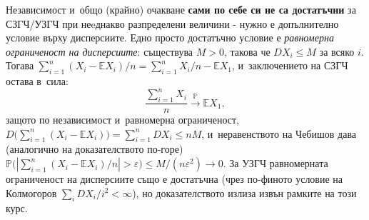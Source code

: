 \begin{rembox}[Обобщение при \texorpdfstring{$\mathbb EX_1=\mathbb EX_i$}{EX1=EXi}]
Независимост и~общо (крайно) очакване \textbf{сами по себе си не са
достатъчни} за СЗГЧ/УЗГЧ при неeднакво разпределени величини -
нужно е допълнително условие върху дисперсиите. Едно просто
достатъчно условие е \emph{равномерна ограниченост на дисперсиите}:
съществува $M>0$, такова че $DX_i\le M$ за всяко $i$. Тогава
$\sum_{i=1}^n(X_i-\mathbb EX_i)/n = \sum_{i=1}^n X_i/n-\mathbb EX_1$,
и~заключението на СЗГЧ остава в~сила:
\[
  \frac{\sum_{i=1}^n X_i}{n}\xrightarrow{\mathbb P}\mathbb EX_1,
\]
защото по независимост и~равномерна ограниченост,
$D\big(\sum_{i=1}^n(X_i-\mathbb EX_i)\big)=\sum_{i=1}^nDX_i\le nM$, и~неравенството на Чебишов дава (аналогично на доказателството по-горе)
$\mathbb P\big(|\sum_{i=1}^n(X_i-\mathbb EX_i)/n|>\varepsilon\big)\le
M/(n\varepsilon^2)\to0$. За УЗГЧ равномерната ограниченост на
дисперсиите също е достатъчна (чрез по-финото условие на Колмогоров
$\sum_i DX_i/i^2<\infty$), но доказателството излиза извън рамките на
този курс.
\end{rembox}
